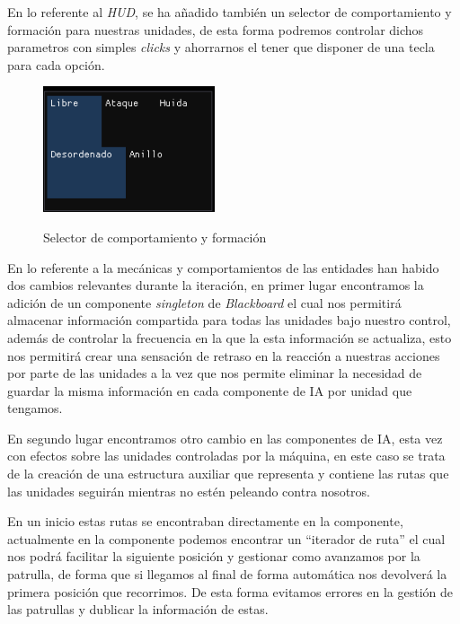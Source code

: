 En lo referente al \textit{HUD}, se ha añadido también un selector de comportamiento y formación
para nuestras unidades, de esta forma podremos controlar dichos parametros con simples \textit{clicks}
y ahorrarnos el tener que disponer de una tecla para cada opción. 

\begin{figure}[ht]
\centering
\includegraphics[width=0.45\textwidth]{imagenes/diario_desarrollo/eleccion_b.png}\\
\caption{Selector de comportamiento y formación}
\label{fig:hud_selec}
\end{figure}

En lo referente a la mecánicas y comportamientos de las entidades han habido dos cambios relevantes durante
la iteración, en primer lugar encontramos la adición de un componente \textit{singleton} de \textit{Blackboard}
el cual nos permitirá almacenar información compartida para todas las unidades bajo nuestro control, además de
controlar la frecuencia en la que la esta información se actualiza, esto nos permitirá crear una sensación
de retraso en la reacción a nuestras acciones por parte de las unidades a la vez que nos permite eliminar
la necesidad de guardar la misma información en cada componente de \ac{IA} por unidad que tengamos.

En segundo lugar encontramos otro cambio en las componentes de \ac{IA}, esta vez con efectos sobre las unidades
controladas por la máquina, en este caso se trata de la creación de una estructura auxiliar que representa 
y contiene las rutas que las unidades seguirán mientras no estén peleando contra nosotros.

En un inicio estas rutas se encontraban directamente en la componente, actualmente en la componente podemos
encontrar un ``iterador de ruta'' el cual nos podrá facilitar la siguiente posición y gestionar como avanzamos
por la patrulla, de forma que si llegamos al final de forma automática nos devolverá la primera posición
que recorrimos. De esta forma evitamos errores en la gestión de las patrullas y dublicar la información de estas.
 

